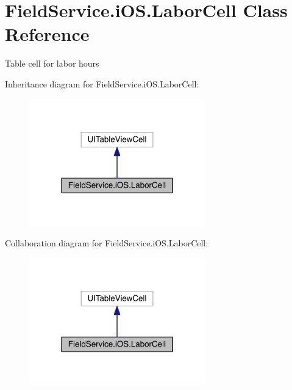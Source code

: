 \hypertarget{class_field_service_1_1i_o_s_1_1_labor_cell}{\section{Field\+Service.\+i\+O\+S.\+Labor\+Cell Class Reference}
\label{class_field_service_1_1i_o_s_1_1_labor_cell}
}


Table cell for labor hours  




Inheritance diagram for Field\+Service.\+i\+O\+S.\+Labor\+Cell\+:
\nopagebreak
\begin{figure}[H]
\begin{center}
\leavevmode
\includegraphics[width=216pt]{class_field_service_1_1i_o_s_1_1_labor_cell__inherit__graph}
\end{center}
\end{figure}


Collaboration diagram for Field\+Service.\+i\+O\+S.\+Labor\+Cell\+:
\nopagebreak
\begin{figure}[H]
\begin{center}
\leavevmode
\includegraphics[width=216pt]{class_field_service_1_1i_o_s_1_1_labor_cell__coll__graph}
\end{center}
\end{figure}
